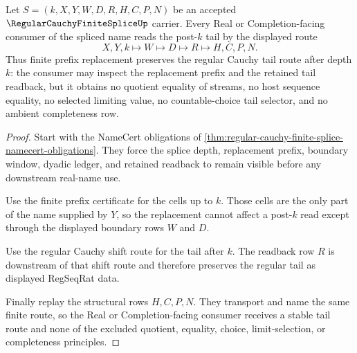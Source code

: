 \begin{theorem}
\label{thm:regular-cauchy-finite-splice-tail-stability}
Let $S=(k,X,Y,W,D,R,H,C,P,N)$ be an accepted $\RegularCauchyFiniteSpliceUp$ carrier. Every Real or Completion-facing consumer of the spliced name reads the post-$k$ tail by the displayed route
$$
X,Y,k \longmapsto W \longmapsto D \longmapsto R \longmapsto H,C,P,N .
$$
Thus finite prefix replacement preserves the regular Cauchy tail route after depth $k$: the consumer may inspect the replacement prefix and the retained tail readback, but it obtains no quotient equality of streams, no host sequence equality, no selected limiting value, no countable-choice tail selector, and no ambient completeness row.
\end{theorem}
\begin{proof}
Start with the NameCert obligations of \autoref{thm:regular-cauchy-finite-splice-namecert-obligations}. They force the splice depth, replacement prefix, boundary window, dyadic ledger, and retained readback to remain visible before any downstream real-name use.

Use the finite prefix certificate for the cells up to $k$. Those cells are the only part of the name supplied by $Y$, so the replacement cannot affect a post-$k$ read except through the displayed boundary rows $W$ and $D$.

Use the regular Cauchy shift route for the tail after $k$. The readback row $R$ is downstream of that shift route and therefore preserves the regular tail as displayed RegSeqRat data.

Finally replay the structural rows $H,C,P,N$. They transport and name the same finite route, so the Real or Completion-facing consumer receives a stable tail route and none of the excluded quotient, equality, choice, limit-selection, or completeness principles.
\end{proof}

